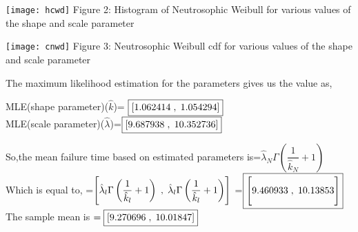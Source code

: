\documentclass[12pt,a4paper,oneside]{article}
\begin{document}
\begin{center}
\hspace{2cm}
\texttt{[image: hcwd]}
\newline 
Figure 2: Histogram of Neutrosophic Weibull for various values of the shape and scale parameter 
\end{center}
\begin{center}
\hspace{2cm}
\texttt{[image: cnwd]}
\newline 
Figure 3: Neutrosophic Weibull cdf for various values of the shape and scale parameter 
\end{center}
The maximum likelihood estimation for the parameters gives us the value as,\\
\begin{singlespace}
\hspace{5cm} MLE(shape parameter)($\hat{k}$)= $\boxed{[1.062414\hspace{1mm},\hspace{1mm}1.054294]}$\\
\hspace*{5.6cm} MLE(scale parameter)($\hat{\lambda}$)=$\boxed{[ 9.687938\hspace{1mm},\hspace{1mm}10.352736]}$
\end{singlespace}\newpage
So,the mean failure time based on estimated parameters is=${\hat{\lambda}_{N}}\Gamma\left(\dfrac{1}{\hat{k}_{N}}+1\right)$\\Which is equal to,\newline\newline
\hspace*{5cm}=$\Biggl[{\hat{\lambda}_{l}}\Gamma\left(\dfrac{1}{\hat{k}_{l}}+1\right)\hspace{1mm},\hspace{1mm}{\hat{\lambda}_{l}}\Gamma\left(\dfrac{1}{\hat{k}_{l}}+1\right)\Biggr]$\newline\newline
\hspace*{5cm}=$\boxed{\Biggl[9.460933\hspace{1mm},\hspace{1mm}10.13853\Biggr]}$\newline\newline
The sample mean is $=\boxed{[9.270696\hspace{1mm},\hspace{1mm}10.01847]}$\newline\newline\newline
\end{document}
